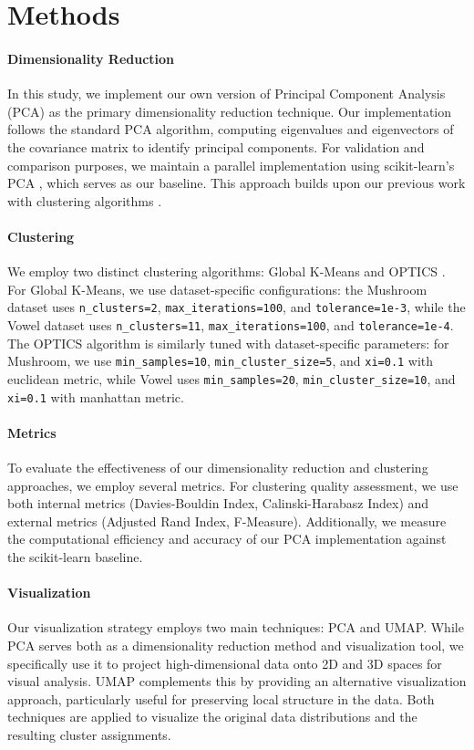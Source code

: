 \section{Methods}
\label{sec:methods}

\paragraph{Dimensionality Reduction}
In this study, we implement our own version of Principal Component Analysis (PCA)
as the primary dimensionality reduction technique. Our implementation follows
the standard PCA algorithm, computing eigenvalues and eigenvectors of the
covariance matrix to identify principal components. For validation and
comparison purposes, we maintain a parallel implementation using
scikit-learn's PCA \cite{scikit-learn}, which serves as our baseline.
This approach builds upon our previous work with clustering algorithms \cite{our-clustering-work}.

\paragraph{Clustering}
We employ two distinct clustering algorithms: Global K-Means \cite{global_kmeans} 
and OPTICS \cite{1999-optics}. For Global K-Means, we use dataset-specific 
configurations: the Mushroom dataset uses \texttt{n\_clusters=2}, 
\texttt{max\_iterations=100}, and \texttt{tolerance=1e-3}, while the Vowel 
dataset uses \texttt{n\_clusters=11}, \texttt{max\_iterations=100}, and 
\texttt{tolerance=1e-4}. The OPTICS algorithm is similarly tuned with dataset-specific 
parameters: for Mushroom, we use \texttt{min\_samples=10}, \texttt{min\_cluster\_size=5}, 
and \texttt{xi=0.1} with euclidean metric, while Vowel uses \texttt{min\_samples=20}, 
\texttt{min\_cluster\_size=10}, and \texttt{xi=0.1} with manhattan metric.

\paragraph{Metrics}
To evaluate the effectiveness of our dimensionality reduction and clustering
approaches, we employ several metrics. For clustering quality assessment,
we use both internal metrics (Davies-Bouldin Index, Calinski-Harabasz Index)
and external metrics (Adjusted Rand Index, F-Measure). Additionally, we measure
the computational efficiency and accuracy of our PCA implementation against
the scikit-learn baseline.

\paragraph{Visualization}
Our visualization strategy employs two main techniques: PCA and UMAP.
While PCA serves both as a dimensionality reduction method and visualization
tool, we specifically use it to project high-dimensional data onto
2D and 3D spaces for visual analysis. UMAP complements this by providing
an alternative visualization approach, particularly useful for preserving
local structure in the data. Both techniques are applied to visualize
the original data distributions and the resulting cluster assignments.

